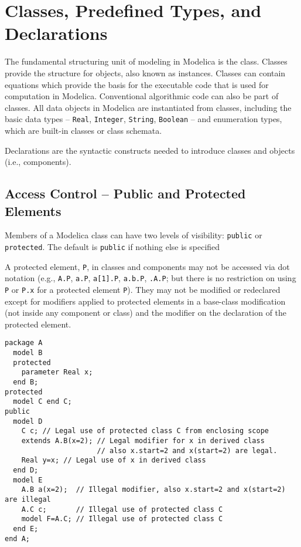 \chapter{Classes, Predefined Types, and Declarations}\label{class-predefined-types-and-declarations}

The fundamental structuring unit of modeling in Modelica is the class.
Classes provide the structure for objects, also known as instances.
Classes can contain equations which provide the basis for the executable
code that is used for computation in Modelica. Conventional algorithmic
code can also be part of classes. All data objects in Modelica are
instantiated from classes, including the basic data types -- \lstinline!Real!,
\lstinline!Integer!, \lstinline!String!, \lstinline!Boolean! -- and enumeration types, which are built-in
classes or class schemata.

Declarations are the syntactic constructs needed to introduce classes
and objects (i.e., components).

\section{Access Control -- Public and Protected Elements}\label{access-control-public-and-protected-elements}

Members of a Modelica class can have two levels of visibility: \lstinline!public! or
\lstinline!protected!. The default is \lstinline!public! if nothing else is specified

A protected element, \lstinline!P!, in classes and components may not be accessed via dot notation (e.g., \lstinline!A.P!, \lstinline!a.P!, \lstinline!a[1].P!, \lstinline!a.b.P!,
\lstinline!.A.P!; but there is no restriction on using \lstinline!P! or \lstinline!P.x! for a protected element \lstinline!P!).  They may not be modified or redeclared except for
modifiers applied to protected elements in a base-class modification (not inside any component or class) and the modifier on the declaration of the protected element.

\begin{example}
\begin{lstlisting}[language=modelica]
package A
  model B
  protected
    parameter Real x;
  end B;
protected
  model C end C;
public
  model D
    C c; // Legal use of protected class C from enclosing scope
    extends A.B(x=2); // Legal modifier for x in derived class
                      // also x.start=2 and x(start=2) are legal.
    Real y=x; // Legal use of x in derived class
  end D;
  model E
    A.B a(x=2);  // Illegal modifier, also x.start=2 and x(start=2) are illegal
    A.C c;       // Illegal use of protected class C
    model F=A.C; // Illegal use of protected class C
  end E;
end A;
\end{lstlisting}
\end{example}

